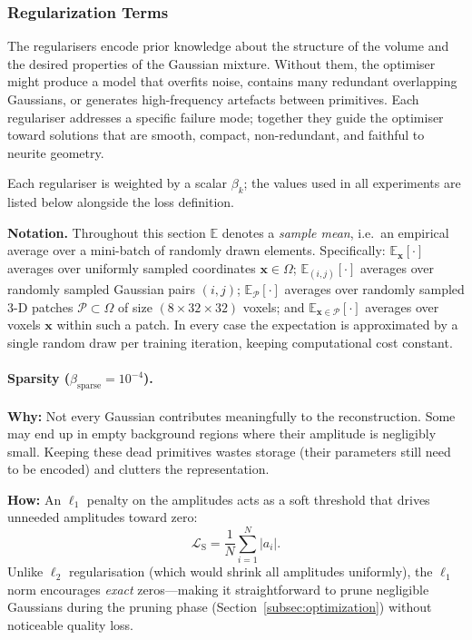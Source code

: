 \documentclass[11pt,a4paper]{article}
\begin{document}
\subsubsection{Regularization Terms}

The regularisers encode prior knowledge about the structure of the volume and the desired properties of the Gaussian mixture.  Without them, the optimiser might produce a model that overfits noise, contains many redundant overlapping Gaussians, or generates high-frequency artefacts between primitives.  Each regulariser addresses a specific failure mode; together they guide the optimiser toward solutions that are smooth, compact, non-redundant, and faithful to neurite geometry.

Each regulariser is weighted by a scalar $\beta_k$; the values used in all experiments are listed below alongside the loss definition.

\textbf{Notation.}  Throughout this section $\mathbb{E}$ denotes a \emph{sample mean}, i.e.\ an empirical average over a mini-batch of randomly drawn elements.  Specifically:
$\mathbb{E}_{\mathbf{x}}[\cdot]$ averages over uniformly sampled coordinates $\mathbf{x}\in\Omega$;
$\mathbb{E}_{(i,j)}[\cdot]$ averages over randomly sampled Gaussian pairs $(i,j)$;
$\mathbb{E}_{\mathcal{P}}[\cdot]$ averages over randomly sampled 3-D patches $\mathcal{P}\subset\Omega$ of size $(8\times32\times32)$ voxels; and
$\mathbb{E}_{\mathbf{x}\in\mathcal{P}}[\cdot]$ averages over voxels $\mathbf{x}$ within such a patch.
In every case the expectation is approximated by a single random draw per training iteration, keeping computational cost constant.

\paragraph{Sparsity ($\beta_{\text{sparse}} = 10^{-4}$).}
\textbf{Why:} Not every Gaussian contributes meaningfully to the reconstruction.  Some may end up in empty background regions where their amplitude is negligibly small.  Keeping these dead primitives wastes storage (their parameters still need to be encoded) and clutters the representation.

\textbf{How:} An $\ell_1$ penalty on the amplitudes acts as a soft threshold that drives unneeded amplitudes toward zero:
\begin{equation}
\mathcal{L}_{\mathrm{S}} = \frac{1}{N}\sum_{i=1}^{N}|a_i|.
\label{eq:sparsity}
\end{equation}
Unlike $\ell_2$ regularisation (which would shrink all amplitudes uniformly), the $\ell_1$ norm encourages \emph{exact} zeros---making it straightforward to prune negligible Gaussians during the pruning phase (Section~\ref{subsec:optimization}) without noticeable quality loss.
\end{document}
